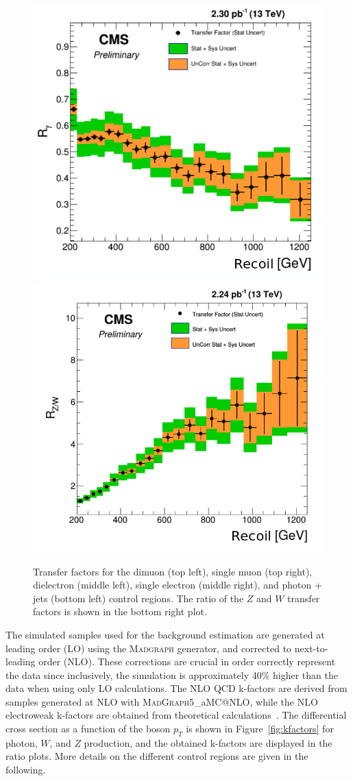 \begin{figure}[p]
 \vspace{.2cm}
 \includegraphics[width=.48\textwidth]{gamma_TF.png} 
 \includegraphics[width=.49\textwidth]{ZW_ratio.png} 
 \caption{Transfer factors for the dimuon (top left), single muon (top right), dielectron (middle left), single electron (middle right), and photon + jets (bottom left) control regions. The ratio of the $Z$ and $W$ transfer factors is shown in the bottom right plot.}
 \label{fig:TF}
\end{figure}

The simulated samples used for the background estimation are generated at leading order (LO) using the \textsc{Madgraph} generator, and corrected to next-to-leading order (NLO). These corrections are crucial in order correctly represent the data since inclusively, the simulation is approximately 40\% higher than the data when using only LO calculations. The NLO QCD k-factors are derived from samples generated at NLO with \textsc{MadGraph5\_}a\textsc{MC@NLO}, while the \ac{NLO} electroweak k-factors are obtained from theoretical calculations~\cite{Kuhn:2005gv, Kallweit:2015fta, Kallweit:2014xda, Kallweit:2015dum}. The differential cross section as a function of the boson $p_T$ is shown in Figure~\ref{fig:kfactors} for photon, $W$, and $Z$ production, and the obtained k-factors are displayed in the ratio plots. More details on the different control regions are given in the following.

